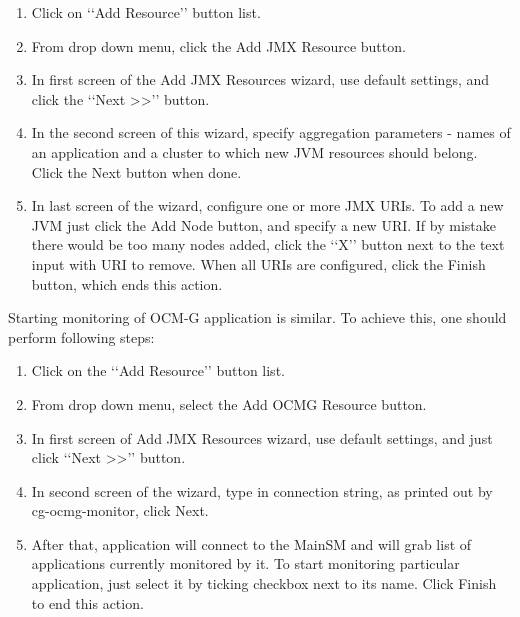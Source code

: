 \begin{enumerate}

\item Click on \lq\lq{}Add Resource\rq\rq{} button list. 

\item From drop down menu, click the Add JMX Resource button.

\item In first screen of the Add JMX Resources wizard, use default settings, and click the \lq\lq{}Next >>\rq\rq{} button.

\item In the second screen of this wizard, specify aggregation parameters - names of an application and a cluster to which new JVM resources should belong. Click the Next button when done.

\item In last screen of the wizard, configure one or more JMX URIs. To add a new JVM just click the Add Node button, and specify a new URI. If by mistake there would be too many nodes added, click the \lq\lq{}X\rq\rq{} button next to the text input with URI to remove. When all URIs are configured, click the Finish button, which ends this action.

\end{enumerate}

Starting monitoring of OCM-G application is  similar. To achieve this, one should perform following steps:

\begin{enumerate}

\item Click on the \lq\lq{}Add Resource\rq\rq{} button list.

\item From drop down menu, select the Add OCMG Resource button.

\item In first screen of Add JMX Resources wizard, use default settings, and just click \lq\lq{}Next >>\rq\rq{} button.

\item In second screen of the wizard, type in connection string, as printed out by cg-ocmg-monitor, click Next.

\item After that, application will connect to the MainSM and will grab list of applications currently monitored by it. To start monitoring particular application, just select it by ticking checkbox next to its name. Click Finish to end this action.

\end{enumerate}

